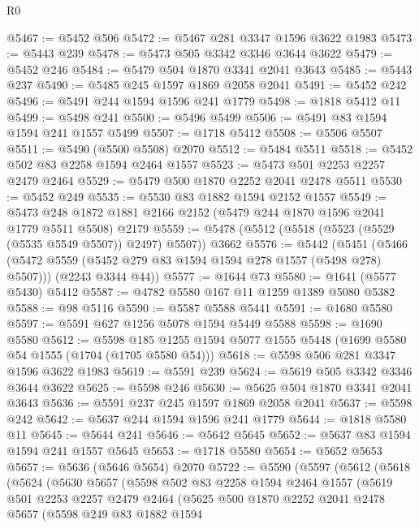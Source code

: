 \begin{lexlean}{R0}
\begin{coremodule}
@5467 := @5452 @506
@5472 := @5467 @281 @3347 @1596 @3622 @1983
@5473 := @5443 @239
@5478 := @5473 @505 @3342 @3346 @3644 @3622
@5479 := @5452 @246
@5484 := @5479 @504 @1870 @3341 @2041 @3643
@5485 := @5443 @237
@5490 := @5485 @245 @1597 @1869 @2058 @2041
@5491 := @5452 @242
@5496 := @5491 @244 @1594 @1596 @241 @1779
@5498 := @1818 @5412 @11
@5499 := @5498 @241
@5500 := @5496 @5499
@5506 := @5491 @83 @1594 @1594 @241 @1557 @5499
@5507 := @1718 @5412
@5508 := @5506 @5507
@5511 := @5490 (@5500 @5508) @2070
@5512 := @5484 @5511
@5518 := @5452 @502 @83 @2258 @1594 @2464 @1557
@5523 := @5473 @501 @2253 @2257 @2479 @2464
@5529 := @5479 @500 @1870 @2252 @2041 @2478 @5511
@5530 := @5452 @249
@5535 := @5530 @83 @1882 @1594 @2152 @1557
@5549 := @5473 @248 @1872 @1881 @2166 @2152 (@5479 @244 @1870 @1596 @2041 @1779 @5511 @5508) @2179
@5559 := @5478 (@5512 (@5518 (@5523 (@5529 (@5535 @5549 @5507)) @2497) @5507)) @3662
@5576 := @5442
    (@5451
      (@5466 (@5472 @5559 (@5452 @279 @83 @1594 @1594 @278 @1557 (@5498 @278) @5507)))
      (@2243 @3344 @44))
@5577 := @1644 @73
@5580 := @1641 (@5577 @5430) @5412
@5587 := @4782 @5580 @167 @11 @1259 @1389 @5080 @5382
@5588 := @98 @5116
@5590 := @5587 @5588 @5441
@5591 := @1680 @5580
@5597 := @5591 @627 @1256 @5078 @1594 @5449 @5588
@5598 := @1690 @5580
@5612 := @5598 @185 @1255 @1594 @5077 @1555 @5448 (@1699 @5580 @54 @1555 (@1704 (@1705 @5580 @54)))
@5618 := @5598 @506 @281 @3347 @1596 @3622 @1983
@5619 := @5591 @239
@5624 := @5619 @505 @3342 @3346 @3644 @3622
@5625 := @5598 @246
@5630 := @5625 @504 @1870 @3341 @2041 @3643
@5636 := @5591 @237 @245 @1597 @1869 @2058 @2041
@5637 := @5598 @242
@5642 := @5637 @244 @1594 @1596 @241 @1779
@5644 := @1818 @5580 @11
@5645 := @5644 @241
@5646 := @5642 @5645
@5652 := @5637 @83 @1594 @1594 @241 @1557 @5645
@5653 := @1718 @5580
@5654 := @5652 @5653
@5657 := @5636 (@5646 @5654) @2070
@5722 := @5590
    (@5597
      (@5612
        (@5618
          (@5624
            (@5630
              @5657
              (@5598
                @502
                @83
                @2258
                @1594
                @2464
                @1557
                (@5619
                  @501
                  @2253
                  @2257
                  @2479
                  @2464
                  (@5625
                    @500
                    @1870
                    @2252
                    @2041
                    @2478
                    @5657
                    (@5598
                      @249
                      @83
                      @1882
                      @1594

\end{coremodule}
\end{lexlean}

